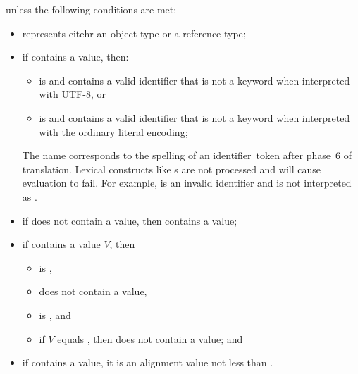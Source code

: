 \begin{itemdescr}
\pnum
\throws
{} unless the following conditions are met:
\begin{itemize}
\item
   represents eitehr an object type or a reference type;
\item
  if  contains a value, then:
  \begin{itemize}
  \item
     is 
    and 
    contains a valid identifier
    that is not a keyword
    when interpreted with UTF-8, or
  \item
     is 
    and 
    contains a valid identifier
    that is not a keyword
    when interpreted with the ordinary literal encoding;
  \end{itemize}
  \begin{note}
  The name corresponds to the spelling of an identifier~token
  after phase~6 of translation.
  Lexical constructs like
  s are not processed
  and will cause evaluation to fail.
  For example,  is an invalid identifier
  and is not interpreted as .
  \end{note}
\item
  if  does not contain a value,
  then  contains a value;
\item
  if  contains a value $V$, then
  \begin{itemize}
  \item
     is ,
  \item
     does not contain a value,
  \item
     is , and
  \item
    if $V$ equals ,
    then  does not contain a value; and
  \end{itemize}
  \item
    if  contains a value,
    it is an alignment value
    not less than .
\end{itemize}
\end{itemdescr}


